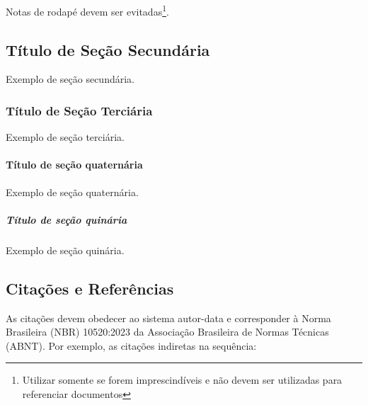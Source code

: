 \documentclass[%
  a4paper,%
  12pt,%
  fleqn,%
  english,%
  brazilian,%
]{article}
\begin{document}
\begin{OverleafFreePlan}
Notas de rodapé devem ser evitadas\footnote{Utilizar somente se forem imprescindíveis e não devem ser utilizadas para referenciar documentos}.

\subsection{Título de Seção Secundária}%
\label{ssect:lvl-2}

Exemplo de seção secundária.

\subsubsection{Título de Seção Terciária}%
\label{sssect:lvl-3}

Exemplo de seção terciária.

\paragraph{Título de seção quaternária}%
\label{prgh:lvl-4}

Exemplo de seção quaternária.

\subparagraph{Título de seção quinária}%
\label{sprgh:lvl-5}

Exemplo de seção quinária.

\subsection{Citações e Referências}%
\label{ssect:cit-ref}%

As citações devem obedecer ao sistema autor-data e corresponder à Norma Brasileira (NBR) 10520:2023 da Associação Brasileira de Normas Técnicas (ABNT).
Por exemplo, as citações indiretas na sequência:


\end{OverleafFreePlan}
\end{document}
